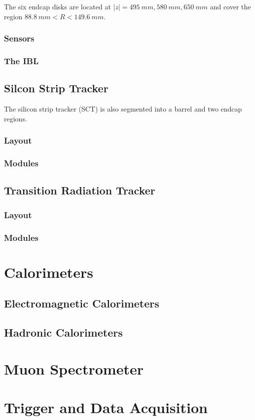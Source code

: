 The six endcap disks are located at $|z| = 495~mm, 580~mm, 650~mm$
and cover the region $88.8~mm < R < 149.6~mm$.

\subsubsection{Sensors}

\subsubsection{The IBL}

\subsection{Silcon Strip Tracker}

The silicon strip tracker (SCT) is also segmented into a barrel and
two endcap regions. 

\subsubsection{Layout}

\subsubsection{Modules}

\subsection{Transition Radiation Tracker}

\subsubsection{Layout}
\subsubsection{Modules}

\section{Calorimeters}
\subsection{Electromagnetic Calorimeters}
\subsection{Hadronic Calorimeters}
\section{Muon Spectrometer}
\section{Trigger and Data Acquisition}